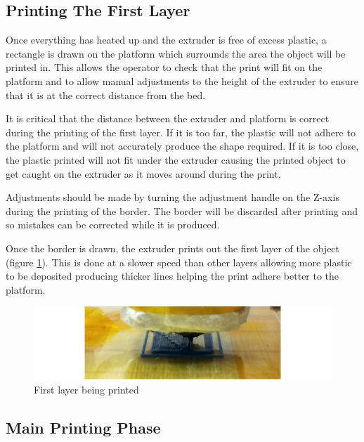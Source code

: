 		\subsection{Printing The First Layer}
			
			Once everything has heated up and the extruder is free of excess plastic,
			a rectangle is drawn on the platform which surrounds the area the object
			will be printed in. This allows the operator to check that the print will
			fit on the platform and to allow manual adjustments to the height of the
			extruder to ensure that it is at the correct distance from the bed.
			
			It is critical that the distance between the extruder and platform is
			correct during the printing of the first layer. If it is too far, the
			plastic will not adhere to the platform and will not accurately produce
			the shape required. If it is too close, the plastic printed will not fit
			under the extruder causing the printed object to get caught on the
			extruder as it moves around during the print.
			
			Adjustments should be made by turning the adjustment handle on the Z-axis
			during the printing of the border. The border will be discarded after
			printing and so mistakes can be corrected while it is produced.
			
			Once the border is drawn, the extruder prints out the first layer of the
			object (figure \ref{fig:firstLayer}). This is done at a slower speed than
			other layers allowing more plastic to be deposited producing thicker
			lines helping the print adhere better to the platform.
			
			\begin{figure}
				\includegraphics[width=1\textwidth]{diagrams/firstLayer.pdf}
				\caption{First layer being printed}
				\label{fig:firstLayer}
			\end{figure}
			
		\subsection{Main Printing Phase}
			
